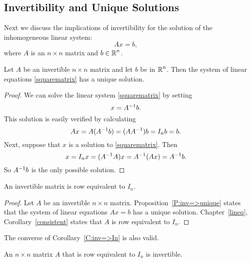 \documentclass{ximera}
\begin{document}
\subsection*{Invertibility and Unique Solutions}

Next we discuss the implications of invertibility for the
solution of the inhomogeneous linear system:  
\begin{equation}  \label{squarematrix}
Ax=b,
\end{equation}
where $A$ is an $n\times n$ matrix and $b\in\mbox{$\Bbb{R}$}^n$.

\begin{proposition} \label{P:inv=>unique}
Let $A$ be an invertible $n\times n$ matrix and let $b$ be in $\mbox{$\Bbb{R}$}^n$.
Then the system of linear equations \eqref{squarematrix} has a unique solution.
\end{proposition}

\begin{proof}  We can solve the linear system \eqref{squarematrix} by setting
\begin{equation}  \label{soln}
x=A^{-1} b.
\end{equation}
This solution is easily verified by calculating
\[
Ax=A(A^{-1} b) = (AA^{-1})b = I_nb = b.
\]
Next, suppose that $x$ is a solution to \eqref{squarematrix}.  Then
\[
x = I_n x = (A^{-1} A)x = A^{-1}(Ax) = A^{-1} b.
\]
So $A^{-1} b$ is the only possible solution.  \end{proof}

\begin{corollary} \label{C:inv=>In}
An invertible matrix is row equivalent to $I_n$.
\end{corollary}

\begin{proof}  Let $A$ be an invertible $n\times n$ matrix.
Proposition~\ref{P:inv=>unique} states that the system of linear equations
$Ax=b$ has a unique solution.  Chapter~\ref{lineq}, Corollary~\ref{consistent}
states that $A$ is row equivalent to $I_n$.  \end{proof}

The converse of Corollary~\ref{C:inv=>In} is also valid.

\begin{proposition}  \label{P:row=>inv}
An $n\times n$ matrix $A$ that is row equivalent to $I_n$ is invertible.
\end{proposition}
\end{document}
